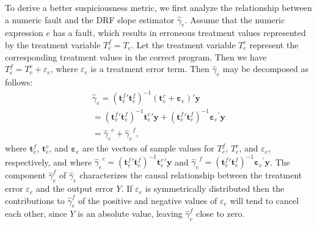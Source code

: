 \documentclass[times]{stvrauth}
\begin{document}
To derive a better suspiciousness metric, we first analyze the relationship between a numeric fault and the DRF slope estimator $\hat \gamma_e$. Assume that the numeric expression $e$ has a fault, which results in erroneous treatment values represented by the treatment variable $T_e^f=T_e$.  Let the treatment variable $T_e^c$ represent the corresponding treatment values in the correct program. Then we have $T_e^f=T_e^c+\varepsilon_e$, where $\varepsilon_e$ is a treatment error term.  Then $\hat \gamma_e $ may be decomposed as follows:
\begin{equation}\label{decomp}
\begin{array}{l}
{{\hat \gamma}_e} = {({{\pmb t}_e^f}'{\pmb t}_e^f)^{ - 1}}({\pmb t}_e^c + {{\pmb \varepsilon} _e})'{\pmb y}\\
 = {({{\pmb t}_e^f}'{\pmb t}_e^f)^{ - 1}}{{\pmb t}_e^c}'{\pmb y} + {({{\pmb t}_e^f}'{\pmb t}_e^f)^{ - 1}}{{\pmb \varepsilon} _e}^\prime {\pmb y}\\
 = {{\hat \gamma}_e}^c + {{\hat \gamma}_e}^f,
\end{array}
\end{equation}
where $\pmb{t}_e^f$, $\pmb{t}_e^c$, and ${\pmb \varepsilon}_e$ are the vectors of sample values for $T_e^f$, $T_e^c$, and $\varepsilon_e$, respectively, and where ${{\hat \gamma}_e}^c  = {({{\pmb t}_e^f}'{\pmb t}_e^f)^{ - 1}}{{\pmb t}_e^c}'{\pmb y} $ and ${{\hat \gamma}_e}^f = {({{\pmb t}_e^f}'{\pmb t}_e^f)^{ - 1}}{{\pmb \varepsilon} _e}^\prime {\pmb y}$. The component $\hat \gamma _e^f$ of ${\hat \gamma _e}$ characterizes the causal relationship between the treatment error $\varepsilon_e$ and the output error $Y$. If $\varepsilon_e$ is symmetrically distributed then the contributions to $\hat \gamma _e^f$ of the positive and negative values of $\varepsilon_e$ will tend to cancel each other, since $Y$ is an absolute value, leaving $\hat \gamma _e^f$ close to zero.
\end{document}
